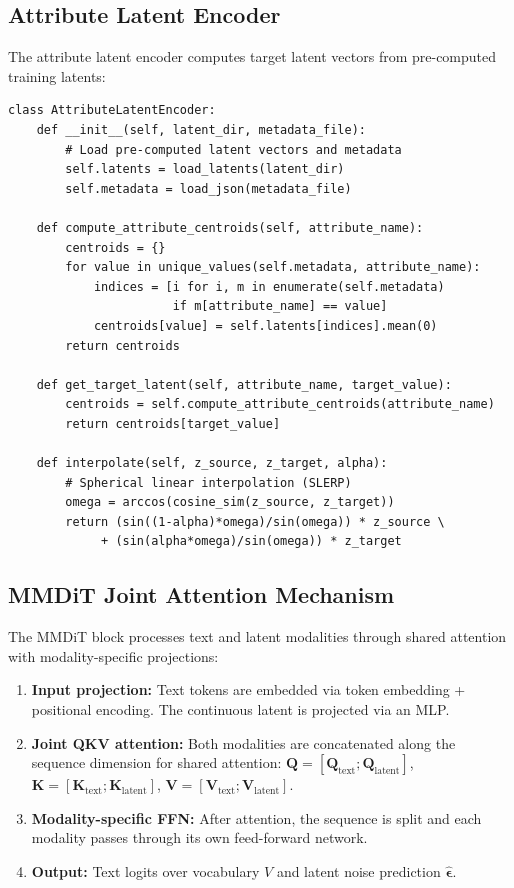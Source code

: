 \documentclass{article}
\begin{document}
\subsection{Attribute Latent Encoder}

The attribute latent encoder computes target latent vectors from pre-computed training latents:

\begin{lstlisting}
class AttributeLatentEncoder:
    def __init__(self, latent_dir, metadata_file):
        # Load pre-computed latent vectors and metadata
        self.latents = load_latents(latent_dir)
        self.metadata = load_json(metadata_file)

    def compute_attribute_centroids(self, attribute_name):
        centroids = {}
        for value in unique_values(self.metadata, attribute_name):
            indices = [i for i, m in enumerate(self.metadata)
                       if m[attribute_name] == value]
            centroids[value] = self.latents[indices].mean(0)
        return centroids

    def get_target_latent(self, attribute_name, target_value):
        centroids = self.compute_attribute_centroids(attribute_name)
        return centroids[target_value]

    def interpolate(self, z_source, z_target, alpha):
        # Spherical linear interpolation (SLERP)
        omega = arccos(cosine_sim(z_source, z_target))
        return (sin((1-alpha)*omega)/sin(omega)) * z_source \
             + (sin(alpha*omega)/sin(omega)) * z_target
\end{lstlisting}

\subsection{MMDiT Joint Attention Mechanism}

The MMDiT block processes text and latent modalities through shared attention with modality-specific projections:

\begin{enumerate}
    \item \textbf{Input projection:} Text tokens are embedded via token embedding + positional encoding. The continuous latent is projected via an MLP.
    \item \textbf{Joint QKV attention:} Both modalities are concatenated along the sequence dimension for shared attention: $\mathbf{Q} = [\mathbf{Q}_\text{text}; \mathbf{Q}_\text{latent}]$, $\mathbf{K} = [\mathbf{K}_\text{text}; \mathbf{K}_\text{latent}]$, $\mathbf{V} = [\mathbf{V}_\text{text}; \mathbf{V}_\text{latent}]$.
    \item \textbf{Modality-specific FFN:} After attention, the sequence is split and each modality passes through its own feed-forward network.
    \item \textbf{Output:} Text logits over vocabulary $V$ and latent noise prediction $\hat{\boldsymbol{\epsilon}}$.
\end{enumerate}
\end{document}
